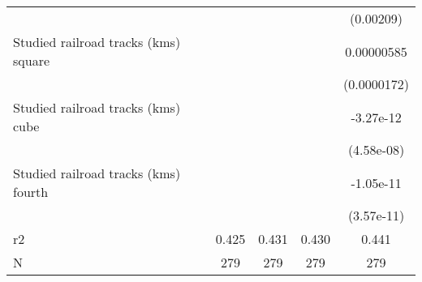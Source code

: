 {\begin{tabular}{l*{4}{c}}
                    &                     &                     &                     &   (0.00209)         \\
[1em]
Studied railroad tracks (kms) square&                     &                     &                     &  0.00000585         \\
                    &                     &                     &                     & (0.0000172)         \\
[1em]
Studied railroad tracks (kms) cube&                     &                     &                     &   -3.27e-12         \\
                    &                     &                     &                     &  (4.58e-08)         \\
[1em]
Studied railroad tracks (kms) fourth&                     &                     &                     &   -1.05e-11         \\
                    &                     &                     &                     &  (3.57e-11)         \\
\hline
r2                  &       0.425         &       0.431         &       0.430         &       0.441         \\
N                   &         279         &         279         &         279         &         279         \\
\hline\hline
\end{tabular}
}
